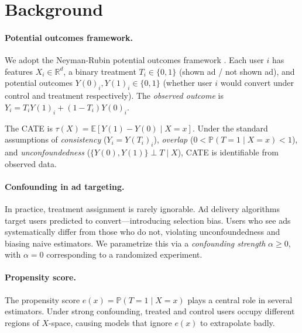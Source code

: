 \documentclass[10pt]{article}
\newcommand{\cate}{\tau(X)}
\newcommand{\Y}[1]{Y(#1)}
\newcommand{\EE}{\mathbb{E}}
\newcommand{\PP}{\mathbb{P}}
\newcommand{\RR}{\mathbb{R}}
\begin{document}
\section{Background}
\label{sec:background}

\paragraph{Potential outcomes framework.}
We adopt the Neyman-Rubin potential outcomes framework \citep{rubin1974estimating}.
Each user $i$ has features $X_i \in \RR^d$, a binary treatment $T_i \in \{0,1\}$
(shown ad / not shown ad), and potential outcomes $\Y{0}_i, \Y{1}_i \in \{0,1\}$
(whether user $i$ would convert under control and treatment respectively). The
\emph{observed outcome} is $Y_i = T_i \Y{1}_i + (1-T_i)\Y{0}_i$.

The CATE is $\cate = \EE[\Y{1} - \Y{0} \mid X = x]$. Under the standard
assumptions of \emph{consistency} ($Y_i = \Y{T_i}_i$), \emph{overlap}
($0 < \PP(T=1 \mid X=x) < 1$), and \emph{unconfoundedness}
($\{Y(0), Y(1)\} \perp T \mid X$), CATE is identifiable from observed data.

\paragraph{Confounding in ad targeting.}
In practice, treatment assignment is rarely ignorable. Ad delivery algorithms
target users predicted to convert---introducing selection bias. Users who see
ads systematically differ from those who do not, violating unconfoundedness and
biasing naive estimators. We parametrize this via a \emph{confounding strength}
$\alpha \geq 0$, with $\alpha = 0$ corresponding to a randomized experiment.

\paragraph{Propensity score.}
The propensity score $e(x) = \PP(T=1 \mid X=x)$ \citep{rosenbaum1983central}
plays a central role in several estimators. Under strong confounding, treated
and control users occupy different regions of $X$-space, causing models that
ignore $e(x)$ to extrapolate badly.
\end{document}
